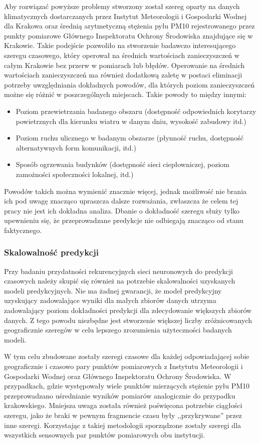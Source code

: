 \documentclass[10pt,a4paper]{article}
\begin{document}
Aby rozwiązać powyższe problemy stworzony został szereg oparty na danych klimatycznych dostarczanych przez Instytut Meteorologii i Gospodarki Wodnej dla Krakowa oraz średnią arytmetyczną stężenia pyłu PM10 rejestrowanego przez punkty pomiarowe Głównego Inspektoratu Ochrony Środowiska znajdujące się w Krakowie. Takie podejście pozwoliło na stworzenie badawczo interesującego szeregu czasowego, który operował na średnich wartościach zanieczyszczeń w całym Krakowie bez przerw w pomiarach lub błędów. 
Operowanie na średnich wartościach zanieczyszczeń ma również dodatkową zaletę w postaci eliminacji potrzeby uwzględniania dokładnych powodów, dla których poziom zanieczyszczeń możne się różnić w poszczególnych miejscach. Takie powody to między innymi: 
\begin{itemize}
	\item Poziom przewietrzania badanego obszaru (dostępność odpowiednich korytarzy powietrznych dla kierunku wiatru w danym dniu, wysokość zabudowy itd.)
	\item Poziom ruchu ulicznego w badanym obszarze (płynność ruchu, dostępność alternatywnych form komunikacji, itd.)
	\item Sposób ogrzewania budynków (dostępność sieci ciepłowniczej, poziom zamożności społeczności lokalnej, itd.)
\end{itemize}
Powodów takich można wymienić znacznie więcej, jednak możliwość nie brania ich pod uwagę znacząco upraszcza dalsze rozważania, zwłaszcza że celem tej pracy nie jest ich dokładna analiza. Dbanie o dokładność szeregu służy tylko upewnieniu się, że przeprowadzane predykcje nie odbiegają znacząco od stanu faktycznego. 
\newpage

\subsubsection{Skalowalność predykcji}
Przy badaniu przydatności rekurencyjnych sieci neuronowych do predykcji czasowych należy skupić się również na potrzebie skalowalności uzyskanych modeli predykcyjnych. Nie ma żadnej gwarancji, że model predykcyjny uzyskujący zadowalające wyniki dla małych zbiorów danych utrzyma zadowalający poziom dokładności predykcji dla zdecydowanie większych zbiorów danych. Z tego powodu niezbędne jest stworzenie większej liczby zróżnicowanych geograficznie szeregów w celu lepszego zrozumienia użyteczności badanych modeli. 

W tym celu zbudowane zostały szeregi czasowe dla każdej odpowiadającej sobie geograficznie i czasowo pary punktów pomiarowych z Instytutu Meteorologii i Gospodarki Wodnej oraz Głównego Inspektoratu Ochrony Środowiska. W przypadkach, gdzie występowały wiele punktów mierzących stężenie pyłu PM10 przeprowadzano uśrednianie wyników pomiarów analogicznie do przypadku krakowskiego. Mniejsza uwaga została również poświęcona potrzebie ciągłości szeregu, jako że braki w pewnym fragmencie czasu były ,,przykrywane'' przez inne szeregi. Korzystając z takiej metodologii sporządzone zostały szeregi dla wszystkich sensownych par punktów pomiarowych obu instytucji.
\end{document}

